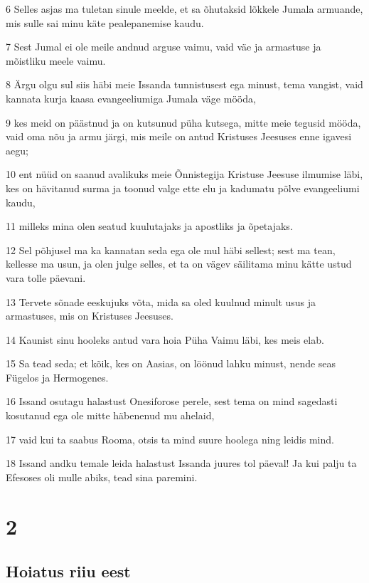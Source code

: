 \par 6 Selles asjas ma tuletan sinule meelde, et sa õhutaksid lõkkele Jumala armuande, mis sulle sai minu käte pealepanemise kaudu.
\par 7 Sest Jumal ei ole meile andnud arguse vaimu, vaid väe ja armastuse ja mõistliku meele vaimu.
\par 8 Ärgu olgu sul siis häbi meie Issanda tunnistusest ega minust, tema vangist, vaid kannata kurja kaasa evangeeliumiga Jumala väge mööda,
\par 9 kes meid on päästnud ja on kutsunud püha kutsega, mitte meie tegusid mööda, vaid oma nõu ja armu järgi, mis meile on antud Kristuses Jeesuses enne igavesi aegu;
\par 10 ent nüüd on saanud avalikuks meie Õnnistegija Kristuse Jeesuse ilmumise läbi, kes on hävitanud surma ja toonud valge ette elu ja kadumatu põlve evangeeliumi kaudu,
\par 11 milleks mina olen seatud kuulutajaks ja apostliks ja õpetajaks.
\par 12 Sel põhjusel ma ka kannatan seda ega ole mul häbi sellest; sest ma tean, kellesse ma usun, ja olen julge selles, et ta on vägev säilitama minu kätte ustud vara tolle päevani.
\par 13 Tervete sõnade eeskujuks võta, mida sa oled kuulnud minult usus ja armastuses, mis on Kristuses Jeesuses.
\par 14 Kaunist sinu hooleks antud vara hoia Püha Vaimu läbi, kes meis elab.
\par 15 Sa tead seda; et kõik, kes on Aasias, on löönud lahku minust, nende seas Fügelos ja Hermogenes.
\par 16 Issand osutagu halastust Onesiforose perele, sest tema on mind sagedasti kosutanud ega ole mitte häbenenud mu ahelaid,
\par 17 vaid kui ta saabus Rooma, otsis ta mind suure hoolega ning leidis mind.
\par 18 Issand andku temale leida halastust Issanda juures tol päeval! Ja kui palju ta Efesoses oli mulle abiks, tead sina paremini.


\chapter{2}

\section*{Hoiatus riiu eest}


